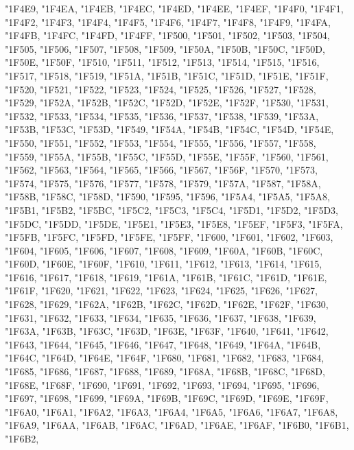 {	"1F4E9,
	"1F4EA,
	"1F4EB,
	"1F4EC,
	"1F4ED,
	"1F4EE,
	"1F4EF,
	"1F4F0,
	"1F4F1,
	"1F4F2,
	"1F4F3,
	"1F4F4,
	"1F4F5,
	"1F4F6,
	"1F4F7,
	"1F4F8,
	"1F4F9,
	"1F4FA,
	"1F4FB,
	"1F4FC,
	"1F4FD,
	"1F4FF,
	"1F500,
	"1F501,
	"1F502,
	"1F503,
	"1F504,
	"1F505,
	"1F506,
	"1F507,
	"1F508,
	"1F509,
	"1F50A,
	"1F50B,
	"1F50C,
	"1F50D,
	"1F50E,
	"1F50F,
	"1F510,
	"1F511,
	"1F512,
	"1F513,
	"1F514,
	"1F515,
	"1F516,
	"1F517,
	"1F518,
	"1F519,
	"1F51A,
	"1F51B,
	"1F51C,
	"1F51D,
	"1F51E,
	"1F51F,
	"1F520,
	"1F521,
	"1F522,
	"1F523,
	"1F524,
	"1F525,
	"1F526,
	"1F527,
	"1F528,
	"1F529,
	"1F52A,
	"1F52B,
	"1F52C,
	"1F52D,
	"1F52E,
	"1F52F,
	"1F530,
	"1F531,
	"1F532,
	"1F533,
	"1F534,
	"1F535,
	"1F536,
	"1F537,
	"1F538,
	"1F539,
	"1F53A,
	"1F53B,
	"1F53C,
	"1F53D,
	"1F549,
	"1F54A,
	"1F54B,
	"1F54C,
	"1F54D,
	"1F54E,
	"1F550,
	"1F551,
	"1F552,
	"1F553,
	"1F554,
	"1F555,
	"1F556,
	"1F557,
	"1F558,
	"1F559,
	"1F55A,
	"1F55B,
	"1F55C,
	"1F55D,
	"1F55E,
	"1F55F,
	"1F560,
	"1F561,
	"1F562,
	"1F563,
	"1F564,
	"1F565,
	"1F566,
	"1F567,
	"1F56F,
	"1F570,
	"1F573,
	"1F574,
	"1F575,
	"1F576,
	"1F577,
	"1F578,
	"1F579,
	"1F57A,
	"1F587,
	"1F58A,
	"1F58B,
	"1F58C,
	"1F58D,
	"1F590,
	"1F595,
	"1F596,
	"1F5A4,
	"1F5A5,
	"1F5A8,
	"1F5B1,
	"1F5B2,
	"1F5BC,
	"1F5C2,
	"1F5C3,
	"1F5C4,
	"1F5D1,
	"1F5D2,
	"1F5D3,
	"1F5DC,
	"1F5DD,
	"1F5DE,
	"1F5E1,
	"1F5E3,
	"1F5E8,
	"1F5EF,
	"1F5F3,
	"1F5FA,
	"1F5FB,
	"1F5FC,
	"1F5FD,
	"1F5FE,
	"1F5FF,
	"1F600,
	"1F601,
	"1F602,
	"1F603,
	"1F604,
	"1F605,
	"1F606,
	"1F607,
	"1F608,
	"1F609,
	"1F60A,
	"1F60B,
	"1F60C,
	"1F60D,
	"1F60E,
	"1F60F,
	"1F610,
	"1F611,
	"1F612,
	"1F613,
	"1F614,
	"1F615,
	"1F616,
	"1F617,
	"1F618,
	"1F619,
	"1F61A,
	"1F61B,
	"1F61C,
	"1F61D,
	"1F61E,
	"1F61F,
	"1F620,
	"1F621,
	"1F622,
	"1F623,
	"1F624,
	"1F625,
	"1F626,
	"1F627,
	"1F628,
	"1F629,
	"1F62A,
	"1F62B,
	"1F62C,
	"1F62D,
	"1F62E,
	"1F62F,
	"1F630,
	"1F631,
	"1F632,
	"1F633,
	"1F634,
	"1F635,
	"1F636,
	"1F637,
	"1F638,
	"1F639,
	"1F63A,
	"1F63B,
	"1F63C,
	"1F63D,
	"1F63E,
	"1F63F,
	"1F640,
	"1F641,
	"1F642,
	"1F643,
	"1F644,
	"1F645,
	"1F646,
	"1F647,
	"1F648,
	"1F649,
	"1F64A,
	"1F64B,
	"1F64C,
	"1F64D,
	"1F64E,
	"1F64F,
	"1F680,
	"1F681,
	"1F682,
	"1F683,
	"1F684,
	"1F685,
	"1F686,
	"1F687,
	"1F688,
	"1F689,
	"1F68A,
	"1F68B,
	"1F68C,
	"1F68D,
	"1F68E,
	"1F68F,
	"1F690,
	"1F691,
	"1F692,
	"1F693,
	"1F694,
	"1F695,
	"1F696,
	"1F697,
	"1F698,
	"1F699,
	"1F69A,
	"1F69B,
	"1F69C,
	"1F69D,
	"1F69E,
	"1F69F,
	"1F6A0,
	"1F6A1,
	"1F6A2,
	"1F6A3,
	"1F6A4,
	"1F6A5,
	"1F6A6,
	"1F6A7,
	"1F6A8,
	"1F6A9,
	"1F6AA,
	"1F6AB,
	"1F6AC,
	"1F6AD,
	"1F6AE,
	"1F6AF,
	"1F6B0,
	"1F6B1,
	"1F6B2,
}
